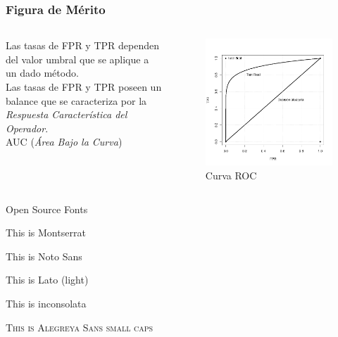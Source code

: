 \documentclass[14pt]{beamer}
\begin{document}
\begin{frame} \frametitle{Figura de M\'erito}
 \small
 \begin{columns}[T]
\begin{column}{0.48\textwidth}
 Las tasas de FPR y TPR dependen del valor umbral que se aplique a un dado m\'etodo.\\ 
 Las tasas de FPR y TPR poseen un balance que se caracteriza por la \textit{Respuesta Caracter\'{i}stica del Operador}.\\ 
 AUC (\textit{\'Area Bajo la Curva})
 \end{column}
 \begin{column}{0.55\textwidth}
 \begin{figure}
 \centering
 \includegraphics[width=\textwidth]{./images/imgs_seminario1/ROC.png}
 \caption{\scriptsize{Curva ROC}}
\end{figure}\pause
\end{column}
 \end{columns}
\end{frame}



\begin{frame}{Open Source Fonts}
 \begin{fullpageitemize}
  \item {\montserratfont This is Montserrat}
  \item {\notosansfont This is Noto Sans}
  \item {\latolightfont This is Lato (light)}
  \item {\inconsolatafont This is inconsolata}
  \item \textsc{This is Alegreya Sans small caps}
 \end{fullpageitemize}
\end{frame}
\end{document}
